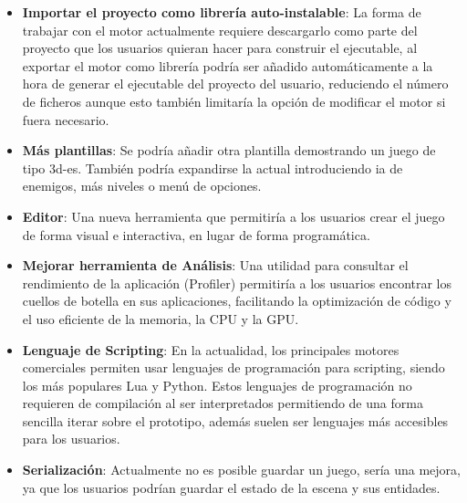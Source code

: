 \begin{itemize}
	\item \textbf{Importar el proyecto como librería auto-instalable}: La forma de trabajar con el motor actualmente
	requiere descargarlo como parte del proyecto que los usuarios quieran hacer para construir el ejecutable, al exportar
    el motor como librería podría ser añadido automáticamente a la hora de generar el ejecutable del proyecto del usuario,
    reduciendo el número de ficheros aunque esto también limitaría la opción de modificar el motor si fuera necesario.
    \item \textbf{Más plantillas}: Se podría añadir otra plantilla demostrando un juego de tipo \gls{3d-es}. También
    podría expandirse la actual introduciendo \gls{ia} de enemigos, más niveles o menú de opciones.
    \item \textbf{Editor}: Una nueva herramienta que permitiría a los usuarios crear el juego de forma visual e interactiva,
    en lugar de forma programática.
    \item \textbf{Mejorar herramienta de Análisis}: Una utilidad para consultar el rendimiento de la aplicación (Profiler)
    permitiría a los usuarios encontrar los cuellos de botella en sus aplicaciones, facilitando la optimización de código
    y el uso eficiente de la memoria, la CPU y la GPU.
    \item \textbf{Lenguaje de Scripting}: En la actualidad, los principales motores comerciales permiten usar lenguajes 
    de programación para scripting, siendo los más populares Lua y Python. Estos lenguajes de programación no requieren
    de compilación al ser interpretados permitiendo de una forma sencilla iterar sobre el prototipo, además suelen
    ser lenguajes más accesibles para los usuarios.
    \item \textbf{Serialización}: Actualmente no es posible guardar un juego, sería una mejora, ya que
    los usuarios podrían guardar el estado de la escena y sus entidades.

\end{itemize}